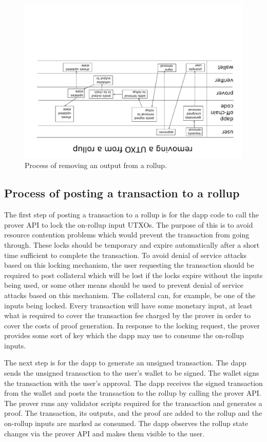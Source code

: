 \documentclass[12pt]{article}
\begin{document}
\begin{figure}
	\includegraphics[angle=180,width=1.0\columnwidth]{process-diagram-c.pdf}
	\caption{Process of removing an output from a rollup.}
	\label{fig:process-c}
\end{figure}

\subsection{Process of posting a transaction to a rollup}

The first step of posting a transaction to a rollup is for the dapp code to call the prover API to lock the on-rollup input UTXOs. The purpose of this is to avoid resource contention problems which would prevent the transaction from going through. These locks should be temporary and expire automatically after a short time sufficient to complete the transaction. To avoid denial of service attacks based on this locking mechanism, the user requesting the transaction should be required to post collateral which will be lost if the locks expire without the inputs being used, or some other means should be used to prevent denial of service attacks based on this mechanism. The collateral can, for example, be one of the inputs being locked. Every transaction will have some monetary input, at least what is required to cover the transaction fee charged by the prover in order to cover the costs of proof generation. In response to the locking request, the prover provides some sort of key which the dapp may use to consume the on-rollup inputs. 

The next step is for the dapp to generate an unsigned transaction. The dapp sends the unsigned transaction to the user's wallet to be signed. The wallet signs the transaction with the user's approval. The dapp receives the signed transaction from the wallet and posts the transaction to the rollup by calling the prover API. The prover runs any validator scripts required for the transaction and generates a proof. The transaction, its outputs, and the proof are added to the rollup and the on-rollup inputs are marked as consumed. The dapp observes the rollup state changes via the prover API and makes them visible to the user.
\end{document}
